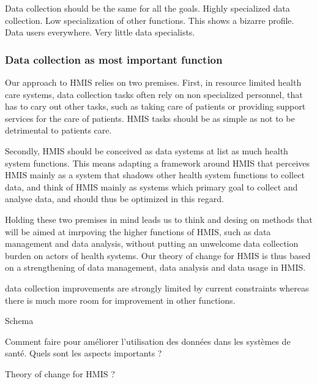 \documentclass[a4paper,11pt,final,twoside]{article}
\begin{document}
Data collection should be the same for all the goals. Highly specialized data collection. Low specialization of other functions. This shows a bizarre profile. Data users everywhere. Very little data specialists.

\subsubsection{Data collection as most important function}

Our approach to HMIS relies on two premises. First, in resource limited health care systems, data collection tasks often rely on non specialized personnel, that has to cary out other tasks, such as taking care of patients or providing support services for the care of patients. HMIS tasks should be as simple as not to be detrimental to patients care.

Secondly, HMIS should be conceived as data systems at list as much health system functions. This means adapting a framework around HMIS that perceives HMIS mainly as a system that shadows other health system functions to collect data, and think of HMIS mainly as systems which primary goal to collect and analyse data, and should thus be optimized in this regard.

Holding these two premises in mind leads us to think and desing on methods that will be aimed at imrpoving the higher functions of HMIS, such as data management and data analysis, without putting an unwelcome data collection burden on actors of health systems. Our theory of change for HMIS is thus based on a strengthening of data management, data analysis and data usage in HMIS.

data collection improvements are strongly limited by current constraints whereas there is much more room for improvement in other functions.

Schema

Comment faire pour améliorer l'utilisation des données dans les systèmes de santé. Quels sont les aspects importants ?

Theory of change for HMIS ?
\end{document}
